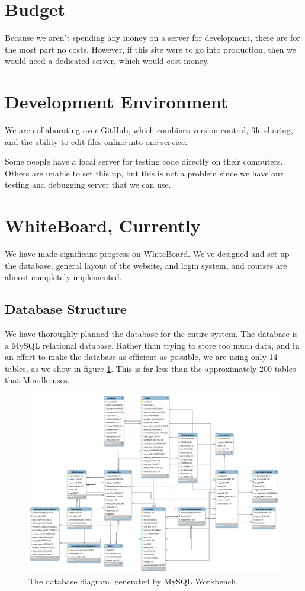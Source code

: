 \documentclass{article}
\begin{document}
\section{Budget}

Because we aren't spending any money on a server for development, there are for
the most part no costs. However, if this site were to go into production, then
we would need a dedicated server, which would cost money.

\section{Development Environment}

We are collaborating over GitHub, which combines version control, file sharing,
and the ability to edit files online into one service.

Some people have a local server for testing code directly on their computers.
Others are unable to set this up, but this is not a problem since we have our
testing and debugging server that we can use.

\section{WhiteBoard, Currently}

We have made significant progress on WhiteBoard. We've designed and set up the
database, general layout of the website, and login system, and courses are
almost completely implemented.

\subsection{Database Structure}

We have thoroughly planned the database for the entire system. The database is
a MySQL relational database. Rather than trying to store too much data, and in
an effort to make the database as efficient as possible, we are using only 14
tables, as we show in figure \ref{fig:db}. This is far less than the
approximately 200 tables that Moodle uses.

\begin{figure}
    \includegraphics[width=\linewidth]{db}
    \caption{The database diagram, generated by MySQL Workbench.}
    \label{fig:db}
\end{figure}
\end{document}
